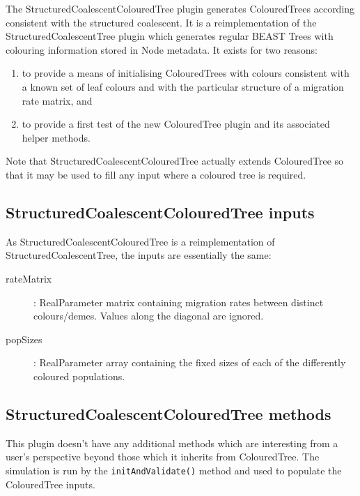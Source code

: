 \documentclass[a4paper,11pt]{paper}
\newcommand{\class}[1]{\textsf{#1}}
\newcommand{\inp}[1]{\textsf{\color{blue}#1}}
\newcommand{\code}[1]{\texttt{#1}}
\begin{document}
The \class{StructuredCoalescentColouredTree} plugin generates
\class{ColouredTree}s according consistent with the structured
coalescent.  It is a reimplementation of the
\class{StructuredCoalescentTree} plugin which generates regular BEAST
\class{Tree}s with colouring information stored in \class{Node}
metadata. It exists for two reasons:
\begin{enumerate}
	\item to provide a means of initialising \class{ColouredTree}s
		with colours consistent with a known set of leaf colours and with the
		particular structure of a migration rate matrix, and
	\item to provide a first test of the new \class{ColouredTree}
		plugin and its associated helper methods.
\end{enumerate}

Note that \class{StructuredCoalescentColouredTree} actually extends
\class{ColouredTree} so that it may be used to fill any input where a
coloured tree is required.

\subsection{StructuredCoalescentColouredTree inputs}

As \class{StructuredCoalescentColouredTree} is a reimplementation of
\class{StructuredCoalescentTree}, the inputs are essentially the same:

\begin{description}
	\item[\inp{rateMatrix}]: \class{RealParameter} matrix containing
		migration rates between distinct colours/demes.  Values along
		the diagonal are ignored.
	\item[\inp{popSizes}]: \class{RealParameter} array containing the
		fixed sizes of each of the differently coloured populations.
\end{description}

\subsection{StructuredCoalescentColouredTree methods}

This plugin doesn't have any additional methods which are interesting
from a user's perspective beyond those which it inherits from
\class{ColouredTree}.  The simulation is run by the
\code{initAndValidate()} method and used to populate the
\class{ColouredTree} inputs.
\end{document}
